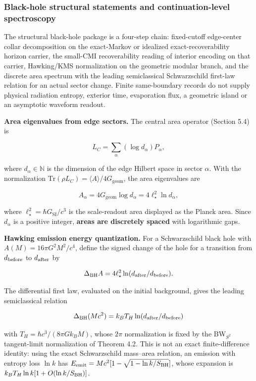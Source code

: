 \subsubsection{Black-hole structural statements and continuation-level spectroscopy}\label{511-discrete-horizon-area-spectrum-and-hawking-emission-established}

The structural black-hole package is a four-step chain: fixed-cutoff edge-center collar
decomposition on the exact-Markov or idealized exact-recoverability horizon carrier, the
small-CMI recoverability reading of interior encoding on that carrier, Hawking/KMS
normalization on the geometric modular branch, and the discrete area spectrum with the leading
semiclassical Schwarzschild first-law relation for an actual sector change. Finite
same-boundary records do not supply physical radiation entropy, exterior time, evaporation
flux, a geometric island or an asymptotic waveform readout.

\textbf{Area eigenvalues from edge sectors.} The central area operator (Section 5.4) is

\[
L_C = \sum_\alpha (\log d_\alpha) P_\alpha,
\]

where \(d_\alpha \in \mathbb{N}\) is the dimension of the edge Hilbert space in sector \(\alpha\). With the normalization \(\mathrm{Tr}(\rho L_C) = \langle A
\rangle / 4G_{\mathrm{geom}}\), the area eigenvalues are

\[
A_\alpha = 4G_{\mathrm{geom}} \log d_\alpha = 4\ell_\star^2 \ln d_\alpha,
\]

where \(\ell_\star^2=\hbar G_{\mathrm{SI}}/c^3\) is the scale-readout area displayed as the
Planck area. Since \(d_\alpha\) is a positive integer, \textbf{areas are discretely spaced} with
logarithmic gaps.

\textbf{Hawking emission energy quantization.} For a Schwarzschild black hole with \(A(M) = 16\pi G^2 M^2/c^4\), define the signed change of the hole for a transition from \(d_{\rm before}\) to \(d_{\rm after}\) by

\[
\Delta_{\rm BH} A = 4\ell_\star^2
\ln(d_{\rm after}/d_{\rm before}).
\]

The differential first law, evaluated on the initial background, gives the leading semiclassical relation

\[
\Delta_{\rm BH}(Mc^2) = k_B T_H
\ln(d_{\rm after}/d_{\rm before})
\]

with \(T_H = \hbar c^3/(8\pi G k_B M)\), whose \(2\pi\)
normalization is fixed by the BW\(_{S^2}\) tangent-limit normalization of
Theorem 4.2. This is not an exact finite-difference identity: using the exact
Schwarzschild mass--area relation, an emission with entropy loss \(\ln k\)
has
\(E_{\rm emit}=Mc^2[1-\sqrt{1-\ln k/S_{\rm BH}}]\), whose expansion is
\(k_BT_H\ln k[1+O(\ln k/S_{\rm BH})]\).

